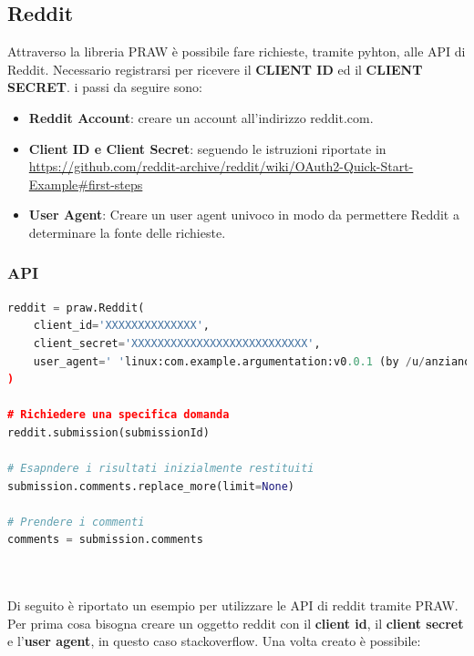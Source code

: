 
\subsection {Reddit} %

Attraverso la libreria PRAW \cite{praw} è possibile fare richieste, tramite pyhton, alle API di Reddit. Necessario registrarsi per ricevere il \textbf{CLIENT ID} ed il \textbf{CLIENT SECRET}. i passi da seguire sono:

\begin{itemize}
    \item \textbf{Reddit Account}:	creare un account all'indirizzo reddit.com.
    \item \textbf{Client ID e Client Secret}: seguendo le istruzioni riportate in \url{https://github.com/reddit-archive/reddit/wiki/OAuth2-Quick-Start-Example#first-steps}
    \item \textbf{User Agent}:	Creare un user agent univoco in modo da permettere Reddit a determinare la fonte delle richieste.
\end{itemize}

\subsubsection {API}

\begin{lstlisting}[language=Python, caption=Stack API in Python]
reddit = praw.Reddit(
    client_id='XXXXXXXXXXXXXX',
    client_secret='XXXXXXXXXXXXXXXXXXXXXXXXXXX',
    user_agent=' 'linux:com.example.argumentation:v0.0.1 (by /u/anzianotti)'
)

# Richiedere una specifica domanda
reddit.submission(submissionId)

# Esapndere i risultati inizialmente restituiti
submission.comments.replace_more(limit=None)

# Prendere i commenti
comments = submission.comments
    
    
\end{lstlisting}

Di seguito è riportato un esempio per utilizzare le API di reddit tramite PRAW. Per prima cosa bisogna creare un oggetto reddit con il \textbf{client id}, il \textbf{client secret} e l'\textbf{user agent}, in questo caso stackoverflow. Una volta creato è possibile:

